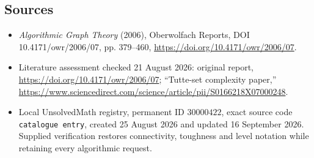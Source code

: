 \documentclass[11pt]{article}
\begin{document}
\subsection{Sources}
\begin{itemize}
\item \emph{Algorithmic Graph Theory} (2006), Oberwolfach Reports, DOI 10.4171/owr/2006/07, pp. 379--460, \url{https://doi.org/10.4171/owr/2006/07}.
\item Literature assessment checked 21 August 2026: original report, \url{https://doi.org/10.4171/owr/2006/07}; ``Tutte-set complexity paper,'' \url{https://www.sciencedirect.com/science/article/pii/S0166218X07000248}.
\item Local UnsolvedMath registry, permanent ID $30000422$, exact source code \texttt{catalogue entry}, created 25 August 2026 and updated 16 September 2026. Supplied verification restores connectivity, toughness and level notation while retaining every algorithmic request.
\end{itemize}
\end{document}
